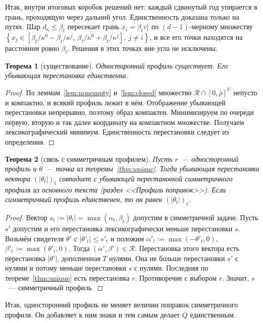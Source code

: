 \documentclass[a4paper,11pt]{article}
\theoremstyle{plain}
\newtheorem{theorem}{Теорема}[section]
\theoremstyle{definition}
\theoremstyle{remark}
\newcommand{\abs}[1]{\left\lvert #1 \right\rvert}
\newcommand{\set}[1]{\left\{ #1 \right\}}
\begin{document}
Итак, внутри итоговых коробок решений нет: каждый сдвинутый год упирается в грань, проходящую через дальний угол. Единственность доказана только на путях. Шар $d_\kappa\le\beta_t$ пересекает грань $x_i=\beta_tv^i_t$ по $(d-1)$-мерному множеству $\set{x_j\in[\beta_t/\kappa^0-\beta_t/\kappa^j,\ \beta_t/\kappa^0+\beta_t/\kappa^j],\ j\ne i}$, и все его точки находятся на расстоянии ровно $\beta_t$. Решения в этих точках вне угла не исключены.

\begin{theorem}[существование]\label{thm:exists}
    Односторонний профиль существует. Его убывающая перестановка единственна.
\end{theorem}

\begin{proof}
    По леммам~\ref{lem:nonempty} и~\ref{lem:closed} множество $\mathcal R\cap[0,\bar\rho]^U$ непусто и компактно, и всякий профиль лежит в нём. Отображение убывающей перестановки непрерывно, поэтому образ компактен. Минимизируем по очереди первую, вторую и так далее координату на компактном множестве. Получаем лексикографический минимум. Единственность перестановки следует из определения.
\end{proof}

\begin{theorem}[связь с симметричным профилем]\label{thm:sym}
    Пусть $r$~--- односторонний профиль и $\theta$~--- точка из теоремы~\ref{thm:unique}. Тогда убывающая перестановка вектора $(\abs{\theta_t})_t$ совпадает с убывающей перестановкой симметричного профиля из основного текста (раздел <<Профиль поправок>>). Если симметричный профиль единственен, то он равен $(\abs{\theta_t})_t$.
\end{theorem}

\begin{proof}
    Вектор $s_t:=\abs{\theta_t}=\max(\alpha_t,\beta_t)$ допустим в симметричной задаче. Пусть $s'$ допустим и его перестановка лексикографически меньше перестановки $s$. Возьмём свидетеля $\theta'$ с $\abs{\theta'_t}\le s'_t$ и положим $\alpha'_t:=\max(-\theta'_t,0)$, $\beta'_t:=\max(\theta'_t,0)$. Тогда $(\alpha',\beta')\in\mathcal R$. Перестановка этого вектора есть перестановка $\abs{\theta'}$, дополненная $T$ нулями. Она не больше перестановки $s'$ с нулями и потому меньше перестановки $s$ с нулями. Последняя по теореме~\ref{thm:unique} есть перестановка $r$. Противоречие с выбором $r$. Значит, $s$~--- симметричный профиль.
\end{proof}

Итак, односторонний профиль не меняет величин поправок симметричного профиля. Он добавляет к ним знаки и тем самым делает $Q$ единственным.
\end{document}
